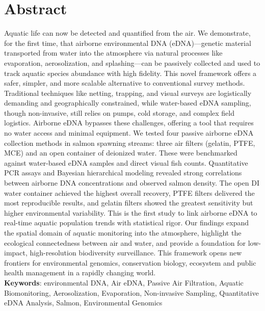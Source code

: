 \documentclass{article}
\begin{document}
\section*{Abstract}
Aquatic life can now be detected and quantified from the air. We demonstrate, for the first time, that airborne environmental DNA (eDNA)—genetic material transported from water into the atmosphere via natural processes like evaporation, aerosolization, and splashing—can be passively collected and used to track aquatic species abundance with high fidelity. This novel framework offers a safer, simpler, and more scalable alternative to conventional survey methods. Traditional techniques like netting, trapping, and visual surveys are logistically demanding and geographically constrained, while water-based eDNA sampling, though non-invasive, still relies on pumps, cold storage, and complex field logistics. Airborne eDNA bypasses these challenges, offering a tool that requires no water access and minimal equipment. We tested four passive airborne eDNA collection methods in salmon spawning streams: three air filters (gelatin, PTFE, MCE) and an open container of deionized water. These were benchmarked against water-based eDNA samples and direct visual fish counts. Quantitative PCR assays and Bayesian hierarchical modeling revealed strong correlations between airborne DNA concentrations and observed salmon density. The open DI water container achieved the highest overall recovery, PTFE filters delivered the most reproducible results, and gelatin filters showed the greatest sensitivity but higher environmental variability. This is the first study to link airborne eDNA to real-time aquatic population trends with statistical rigor. Our findings expand the spatial domain of aquatic monitoring into the atmosphere, highlight the ecological connectedness between air and water, and provide a foundation for low-impact, high-resolution biodiversity surveillance. This framework opens new frontiers for environmental genomics, conservation biology, ecosystem and public health management in a rapidly changing world.\\

\textbf{Keywords}: environmental DNA, Air eDNA, Passive Air Filtration, Aquatic Biomonitoring, Aerosolization, Evaporation, Non-invasive Sampling, Quantitative eDNA Analysis, Salmon, Environmental Genomics
\end{document}
